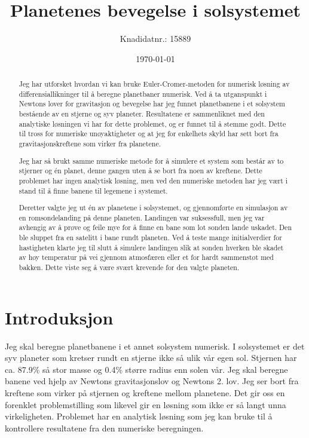\documentclass[reprint,english,notitlepage]{revtex4-1}  %
\begin{document}
\title{Planetenes bevegelse i solsystemet}
\date{\today}
\author{Knadidatnr.: 15889}


\newpage

\begin{abstract}
Jeg har utforsket hvordan vi kan bruke Euler-Cromer-metoden for numerisk løsning av differensiallikninger til å beregne planetbaner numerisk. Ved å ta utganspunkt i Newtons lover for gravitasjon og bevegelse har jeg funnet planetbanene i et solsystem bestående av en stjerne og syv planeter. Resultatene er sammenliknet med den analytiske løsningen vi har for dette problemet, og er funnet til å stemme godt. Dette til tross for numeriske unøyaktigheter og at jeg for enkelhets skyld har sett bort fra gravitasjonskreftene som virker fra planetene.

Jeg har så brukt samme numeriske metode for å simulere et system som består av to stjerner og én planet, denne gangen uten å se bort fra noen av kreftene. Dette problemet har ingen analytisk løsning, men ved den numeriske metoden har jeg vært i stand til å finne banene til legemene i systemet.

Deretter valgte jeg ut én av planetene i solsystemet, og gjennomførte en simulasjon av en romsondelanding på denne planeten. Landingen var suksessfull, men jeg var avhengig av å prøve og feile mye for å finne en bane som lot sonden lande uskadet. Den ble sluppet fra en satelitt i bane rundt planeten. Ved å teste mange initialverdier for hastigheten klarte jeg til slutt å simulere landingen slik at sonden hverken ble skadet av høy temperatur på vei gjennom atmosfæren eller et for hardt sammenstøt med bakken. Dette viste seg å være svært krevende for den valgte planeten.
\end{abstract}
\maketitle                                %



\section{Introduksjon}

Jeg skal beregne planetbanene i et annet solsystem numerisk. I solsystemet er det syv planeter som kretser rundt en stjerne ikke så ulik vår egen sol. Stjernen har ca. 87.9\% så stor masse og 0.4\% større radius enn solen vår. Jeg skal beregne banene ved hjelp av Newtons gravitasjonslov og Newtons 2. lov. Jeg ser bort fra kreftene som virker på stjernen og kreftene mellom planetene. Det gir oss en forenklet problemstilling som likevel gir en løsning som ikke er så langt unna virkeligheten. Problemet har en analytisk løsning som jeg kan bruke til å kontrollere resultatene fra den numeriske beregningen.
\end{document}
